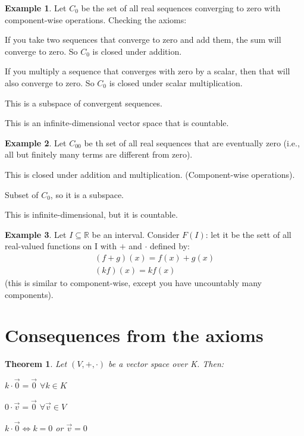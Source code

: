 \documentclass[a4paper, 12pt]{article}
\newtheorem{theorem}{Theorem}
\theoremstyle{definition}
\newtheorem{exmp}{Example}[section]
\theoremstyle{definition}
\theoremstyle{definition}
\theoremstyle{definition}
\newenvironment{enumerate_tight}{
	\begin{enumerate}
		\setlength{\itemsep}{0pt}
		\setlength{\parskip}{0pt}
	}{\end{enumerate}}
\newenvironment{itemize_tight}{
	\begin{itemize}
		\setlength{\itemsep}{0pt}
		\setlength{\parskip}{0pt}
	}{\end{itemize}}
\begin{document}
{\begin{exmp}
	Let $C_0$ be the set of all real sequences converging to zero with component-wise operations. Checking the axioms: 
	\begin{itemize_tight}
		\item If you take two sequences that converge to zero and add them, the sum will converge to zero. So $C_0$ is closed under addition. 
		\item If you multiply a sequence that converges with zero by a scalar, then that will also converge to zero. So $C_0$ is closed under scalar multiplication. 
		\item This is a subspace of convergent sequences. 
		\item This is an infinite-dimensional vector space that is countable. 
	\end{itemize_tight}
\end{exmp}

\begin{exmp}
	Let $C_{00}$ be th set of all real sequences that are eventually zero (i.e., all but finitely many terms are different from zero). 
	\begin{itemize_tight}
		\item This is closed under addition and multiplication. (Component-wise operations). 
		\item Subset of $C_0$, so it is a subspace. 
		\item This is infinite-dimensional, but it is countable. 
	\end{itemize_tight}
\end{exmp}

\begin{exmp}
	Let $I \subseteq \mathbb{R}$ be an interval. Consider $F(I)$: let it be the sett of all real-valued functions on I with $+$ and $\cdot$ defined by: 
	\begin{align*}
		(f+g)(x) = f(x) + g(x) \\
		(kf)(x) = kf(x) 
	\end{align*}
	(this is similar to component-wise, except you have uncountably many components). 
\end{exmp}

\section{Consequences from the axioms}
\begin{theorem}
	Let $(V, +, \cdot)$ be a vector space over K. Then: 
	\begin{enumerate_tight}
		\item $k \cdot \vec{0} = \vec{0}$ $\forall k \in K$
		\item $0 \cdot \vec{v} = \vec{0}$ $\forall \vec{v} \in V$ 
		\item $k \cdot \vec{0} \iff k =0$ or $\vec{v} = 0$ 
	\end{enumerate_tight}
\end{theorem}

}
\end{document}
